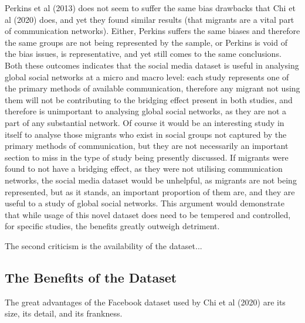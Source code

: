 \documentclass[12pt]{article}
\begin{document}
Perkins et al (2013) does not seem to suffer the same bias drawbacks that Chi et al (2020) does, 
and yet they found similar results (that migrants are a vital part of communication 
networks). Either, Perkins suffers the same biases and therefore the same groups are not 
being represented by the sample, or Perkins is void of the bias issues, is representative, 
and yet still comes to the same conclusions. Both these outcomes indicates that the social 
media dataset is useful in analysing global social networks at a micro and macro level: 
each study represents one of the primary methods of available communication, therefore 
any migrant not using them will not be contributing to the bridging effect present in 
both studies, and therefore is unimportant to analysing global social networks, as they are 
not a part of any substantial network. Of course it would be an interesting study in 
itself to analyse those migrants who exist in social groups not captured by the primary 
methods of communication, but they are not necessarily an important section to miss in the 
type of study being presently discussed. If migrants were found to not have a bridging 
effect, as they were not utilising communication networks, the social media dataset would 
be unhelpful, as migrants are not being represented, but as it stands, an important 
proportion of them are, and they are useful to a study of global social networks. This 
argument would demonstrate that while usage of this novel dataset does need to be 
tempered and controlled, for specific studies, the benefits greatly outweigh detriment. 

The second criticism is the availability of the dataset...

\subsection{The Benefits of the Dataset}

The great advantages of the Facebook dataset used by Chi et al (2020) are its size, 
its detail, and its frankness. 
\end{document}
